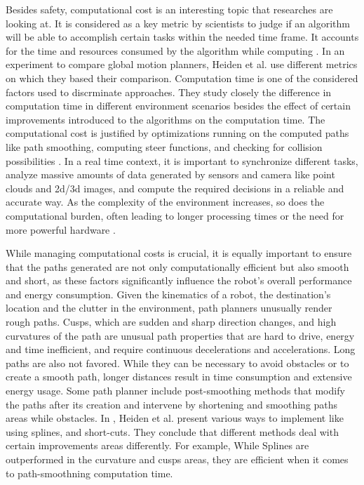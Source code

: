 
Besides safety, computational cost is an interesting topic that researches 
are looking at. It is considered as a key metric by scientists to judge if an algorithm will be able to 
accomplish certain tasks within the needed time frame. It accounts for the time and resources consumed
by the algorithm while computing \cite{R24}. In an experiment to compare global motion planners, Heiden et al. use different metrics on which 
they based their comparison. Computation time is one of the considered factors used to discrminate
approaches. They study closely the difference in computation time in different environment scenarios 
besides the effect of certain improvements introduced to the algorithms on the 
computation time. The computational cost is justified by optimizations running on the computed paths like 
path smoothing, 
computing steer functions, and checking for collision possibilities \cite{R23}. In a real time context, it is important to synchronize different tasks, 
analyze massive amounts of data generated by sensors and camera like point clouds and 2d/3d images, 
and compute the required decisions in a reliable and accurate way. As the complexity of the environment 
increases, so does the computational burden, often leading to longer processing times or the need for 
more powerful hardware \cite{R23}.

While managing computational costs is crucial, it is equally important to ensure that the paths 
generated are not only computationally efficient but also smooth and short, as these factors 
significantly influence the robot's overall performance and energy consumption.
Given the kinematics of a robot, the destination's location and the clutter in the environment, 
path planners unusually render rough paths. Cusps, which are sudden and sharp direction changes, and high
curvatures of the path are unusual path properties that are hard to drive, energy and time inefficient, 
and require continuous decelerations and accelerations. Long paths are also not favored. While they can be 
necessary to avoid obstacles or to create a smooth path, longer distances result in time consumption and 
extensive energy usage. 
Some path planner include post-smoothing methods that modify the paths after its creation and intervene by
shortening and smoothing paths areas while obstacles. In \cite{R23}, Heiden et al. present various ways 
to implement like using splines, and short-cuts. They conclude that different methods deal with certain 
improvements areas differently. For example, While Splines are outperformed in the curvature and cusps 
areas, they are efficient when it comes to path-smoothning computation time.  

